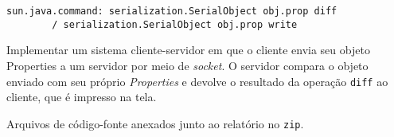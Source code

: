 \documentclass[a4paper, 12pt, answers]{exam}
\begin{document}
\begin{questions}
\begin{parts}
\begin{solution}
        \begin{Verbatim}[label={\$ java serialization.SerialObject obj.prop diff}]
        sun.java.command: serialization.SerialObject obj.prop diff 
        / serialization.SerialObject obj.prop write
        \end{Verbatim}
      \end{solution}
    \end{parts}
    
    \question
    Implementar um sistema cliente-servidor em que o cliente envia seu objeto
    Properties a um servidor por meio de \emph{socket}. O servidor compara
    o objeto enviado com seu próprio \emph{Properties} e devolve o resultado
    da operação \verb|diff| ao cliente, que é impresso na tela.
    
    \begin{solution}
      Arquivos de código-fonte anexados junto ao relatório no \verb|zip|.
    \end{solution}
  \end{questions}
\end{document}
